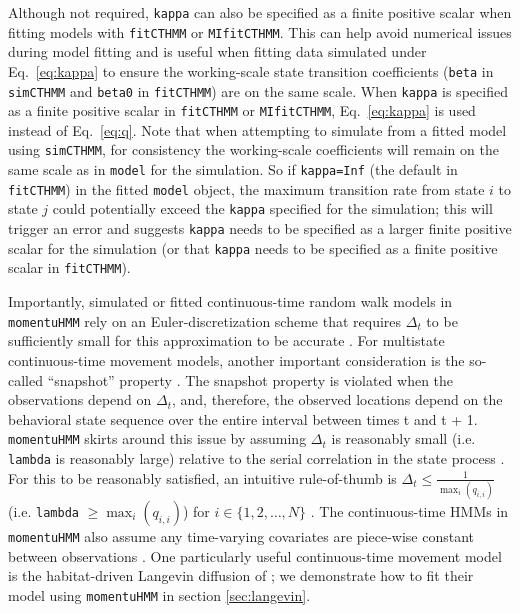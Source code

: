 \documentclass[12pt]{article}\usepackage[]{graphicx}\usepackage[]{xcolor}
\begin{document}
Although not required, \verb|kappa| can also be specified as a finite positive scalar when fitting models with \verb|fitCTHMM| or \verb|MIfitCTHMM|. This can help avoid numerical issues during model fitting and is useful when fitting data simulated under Eq.\ \ref{eq:kappa} to ensure the working-scale state transition coefficients (\verb|beta| in \verb|simCTHMM| and \verb|beta0| in \verb|fitCTHMM|) are on the same scale. When \verb|kappa| is specified as a finite positive scalar in \verb|fitCTHMM| or \verb|MIfitCTHMM|, Eq.\ \ref{eq:kappa} is used instead of Eq.\ \ref{eq:q}. Note that when attempting to simulate from a fitted model using \verb|simCTHMM|, for consistency the working-scale coefficients will remain on the same scale as in \verb|model| for the simulation. So if \verb|kappa=Inf| (the default in \verb|fitCTHMM|) in the fitted \verb|model| object, the maximum transition rate from state $i$ to state $j$ could potentially exceed the \verb|kappa| specified for the simulation; this will trigger an error and suggests \verb|kappa| needs to be specified as a larger finite positive scalar for the simulation (or that \verb|kappa| needs to be specified as a finite positive scalar in \verb|fitCTHMM|).

Importantly, simulated or fitted continuous-time random walk models in \verb|momentuHMM| rely on an Euler-discretization scheme that requires $\Delta_t$ to be sufficiently small for this approximation to be accurate \citep[e.g.][]{MichelotEtAl2019,McClintockLander2024}. For multistate continuous-time movement models, another important consideration is the so-called ``snapshot'' property \citep[e.g.][]{GlennieEtAl2021}. The snapshot property is violated when the observations depend on $\Delta_t$, and, therefore, the observed locations depend on the behavioral state sequence over the entire interval between times t and t + 1. \verb|momentuHMM| skirts around this issue by assuming $\Delta_t$ is reasonably small (i.e. \verb|lambda| is reasonably large) relative to the serial correlation in the state process \citep[e.g.][]{McClintockLander2024}. For this to be reasonably satisfied, an intuitive rule-of-thumb is $\Delta_t \le \frac{1}{\max_i\left(q_{i,i}\right)}$ (i.e. \verb|lambda| $\ge \max_i\left(q_{i,i}\right)$) for $i \in \{1,2,\ldots,N\}$ \citep[][]{GlennieEtAl2021}. The continuous-time HMMs in \verb|momentuHMM| also assume any time-varying covariates are piece-wise constant between observations \citep[e.g.][]{Jackson2011}. %
One particularly useful continuous-time movement model is the habitat-driven Langevin diffusion of \citet{MichelotEtAl2019}; we demonstrate how to fit their model using \verb|momentuHMM| in section \ref{sec:langevin}.
  
\end{document}
